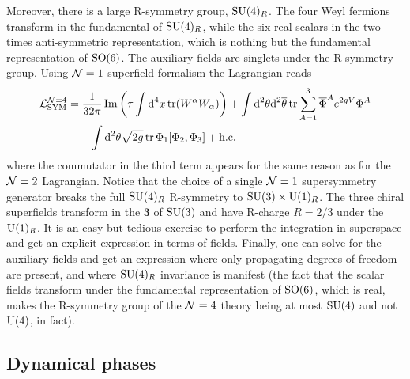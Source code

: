 \documentclass[a4paper,11pt]{article}
\begin{document}
        Moreover, there is a large R-symmetry group, $\text{SU}(4)_R$. The four Weyl fermions transform in the fundamental of $\text{SU}(4)_R$, while the six real scalars in the two times anti-symmetric representation, which is nothing but the fundamental representation of $\text{SO}(6)$. The auxiliary fields are singlets under the R-symmetry group. Using $\mathcal{N} = 1$ superfield formalism the Lagrangian reads
        \begin{align}
            \begin{split}
                \mathcal{L}^{\mathcal{N}=4}_{\text{SYM}} &= \frac{1}{32\pi}\Im \left(\tau\int\text{d}^4x\tr(W^\alpha W_\alpha)\right)+\int\text{d}^2\theta\text{d}^2\overline{\theta}\tr\sum^3_{A=1}\overline{\Phi}^Ae^{2gV}\Phi^A\\
                &\quad-\int\text{d}^2\theta\sqrt{2g}\tr\Phi_1[\Phi_2,\Phi_3]+\text{h.c.}
            \end{split}\label{eq:N4lag}
        \end{align}
        where the commutator in the third term appears for the same reason as for the $\mathcal{N} = 2$ Lagrangian. Notice that the choice of a single $\mathcal{N} = 1$ supersymmetry generator breaks the full $\text{SU}(4)_R$ R-symmetry to $\text{SU}(3)\times \text{U}(1)_R$. The three chiral superfields transform in the $\boldsymbol{3}$ of $\text{SU}(3)$ and have R-charge $R = 2/3$ under the $\text{U}(1)_R$. It is an easy but tedious exercise to perform the integration in superspace and get an explicit expression in terms of fields. Finally, one can solve for the auxiliary fields and get an expression where only propagating degrees of freedom are present, and where $\text{SU}(4)_R$ invariance is manifest (the fact that the scalar fields transform under the fundamental representation of $\text{SO}(6)$, which is real, makes the R-symmetry group of the $\mathcal{N} = 4$ theory being at most $\text{SU}(4)$ and not $\text{U}(4)$, in fact).

    \subsection{Dynamical phases}
\end{document}
